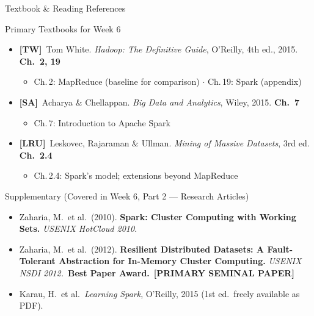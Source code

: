 \documentclass[aspectratio=169,10pt]{beamer}
\begin{document}
\begin{frame}{Textbook \& Reading References}
  \begin{block}{Primary Textbooks for Week 6}
    \begin{itemize}
      \item \textbf{[TW]}\ Tom White. \textit{Hadoop: The Definitive Guide}, O'Reilly, 4th ed., 2015.
            \hfill \textbf{Ch.\ 2, 19}
            \begin{itemize}
              \small\item Ch.\,2: MapReduce (baseline for comparison) $\cdot$ Ch.\,19: Spark (appendix)
            \end{itemize}
      \item \textbf{[SA]}\ Acharya \& Chellappan. \textit{Big Data and Analytics}, Wiley, 2015.
            \hfill \textbf{Ch.\ 7}
            \begin{itemize}
              \small\item Ch.\,7: Introduction to Apache Spark
            \end{itemize}
      \item \textbf{[LRU]}\ Leskovec, Rajaraman \& Ullman. \textit{Mining of Massive Datasets}, 3rd ed.
            \hfill \textbf{Ch.\ 2.4}
            \begin{itemize}
              \small\item Ch.\,2.4: Spark's model; extensions beyond MapReduce
            \end{itemize}
    \end{itemize}
  \end{block}
  \vspace{6pt}
  \begin{exampleblock}{Supplementary (Covered in Week 6, Part 2 --- Research Articles)}
    \begin{itemize}
      \small
      \item Zaharia, M.\ et al.\ (2010). \textbf{Spark: Cluster Computing with Working Sets.}
            \textit{USENIX HotCloud 2010}.
      \item Zaharia, M.\ et al.\ (2012). \textbf{Resilient Distributed Datasets: A Fault-Tolerant Abstraction for In-Memory Cluster Computing.}
            \textit{USENIX NSDI 2012.}\ \textbf{Best Paper Award.}\ \textbf{[PRIMARY SEMINAL PAPER]}
      \item Karau, H.\ et al.\ \textit{Learning Spark}, O'Reilly, 2015 (1st ed.\ freely available as PDF).
    \end{itemize}
  \end{exampleblock}
\end{frame}
\end{document}
